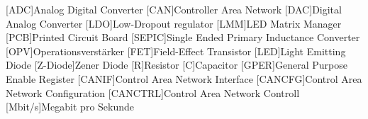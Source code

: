 
\begin{acronym}[ACRONYM]
[ADC]{Analog Digital Converter}
[CAN]{Controller Area Network}
[DAC]{Digital Analog Converter}
[LDO]{Low-Dropout regulator}
[LMM]{LED Matrix Manager}
[PCB]{Printed Circuit Board}
[SEPIC]{Single Ended Primary Inductance Converter}
[OPV]{Operationsverstärker}
[FET]{Field-Effect Transistor}
[LED]{Light Emitting Diode}
[Z-Diode]{Zener Diode}
[R]{Resistor}
[C]{Capacitor}
[GPER]{General Purpose Enable Register}
[CANIF]{Control Area Network Interface}
[CANCFG]{Control Area Network Configuration}
[CANCTRL]{Control Area Network Controll}
[Mbit/s]{Megabit pro Sekunde}
\end{acronym}\newpage

